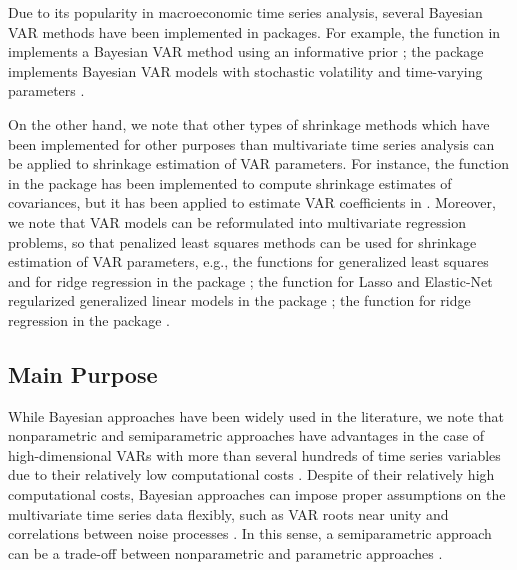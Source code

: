\documentclass[
]{jss}
\begin{document}
Due to its popularity in macroeconomic time series analysis, several
Bayesian VAR methods have been implemented in  packages. For
example, the function  in  implements a Bayesian
VAR method using an informative prior \citep{Tsay18}; the package
 implements Bayesian VAR models with stochastic volatility
and time-varying parameters
\citep{Krueger2015bvarsv, Koop10BayesianVAR, Primiceri2005timevarying}.

On the other hand, we note that other types of shrinkage methods which
have been implemented for other purposes than multivariate time series
analysis can be applied to shrinkage estimation of VAR parameters. For
instance, the function  in the package 
has been implemented to compute shrinkage estimates of covariances, but
it has been applied to estimate VAR coefficients in
\citeauthor{Rhein07c}
\citetext{\citeyear{Rhein07c}; \citealp{Schafer17}}. Moreover, we note
that VAR models can be reformulated into multivariate regression
problems, so that penalized least squares methods can be used for
shrinkage estimation of VAR parameters, e.g., the functions
 for generalized least squares and  for
ridge regression in the package  \citep{Ripley18}; the
function  for Lasso and Elastic-Net regularized
generalized linear models in the package 
\citep{Frideman18}; the function  for ridge
regression in the package  \citep{Moritz18}.

\hypertarget{main-purpose}{%
\subsection{Main Purpose}\label{main-purpose}}

While Bayesian approaches have been widely used in the literature, we
note that nonparametric and semiparametric approaches have advantages in
the case of high-dimensional VARs with more than several hundreds of
time series variables due to their relatively low computational costs
\citep{Rhein07c}. Despite of their relatively high computational costs,
Bayesian approaches can impose proper assumptions on the multivariate
time series data flexibly, such as VAR roots near unity and correlations
between noise processes \citep{LeeChoiKim2016}. In this sense, a
semiparametric approach can be a trade-off between nonparametric and
parametric approaches \citep{LeeChoiKim2016}.
\end{document}
